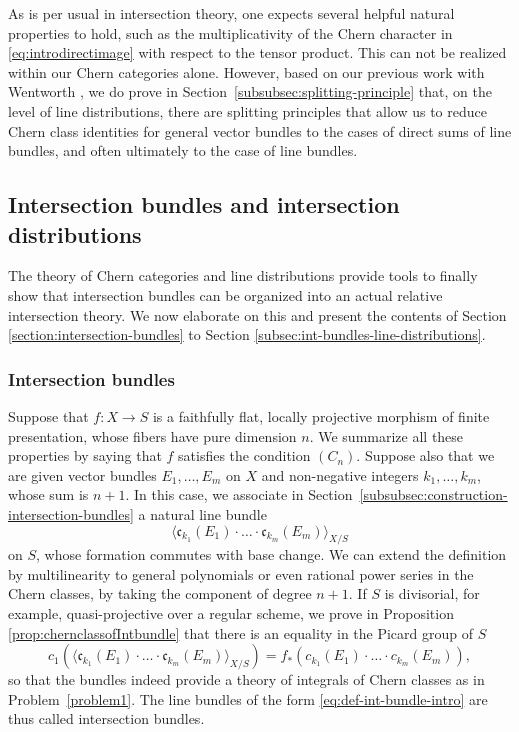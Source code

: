 \documentclass[11pt]{article}
\theoremstyle{plain}
\theoremstyle{definition}
\newcommand{\cfrak}{\mathfrak c}
\begin{document}
As is per usual in intersection theory, one expects several helpful natural properties to hold, such as the multiplicativity of the Chern character in \eqref{eq:introdirectimage} with respect to the tensor product. This can not be realized within our Chern categories alone. However, based on our previous work with Wentworth \cite{Eriksson-Freixas-Wentworth}, we do prove in Section~\ref{subsubsec:splitting-principle} that, on the level of line distributions, there are splitting principles that allow us to reduce Chern class identities for general vector bundles to the cases of direct sums of line bundles, and often ultimately to the case of line bundles.

\subsection{Intersection bundles and intersection distributions}
The theory of Chern categories and line distributions provide tools to finally show that intersection bundles can be organized into an actual relative intersection theory. We now elaborate on this and present the contents of Section \ref{section:intersection-bundles} to Section \ref{subsec:int-bundles-line-distributions}.

\subsubsection*{Intersection bundles} Suppose that $f: X \to S$ is a faithfully flat, locally projective morphism of finite presentation, whose fibers have pure dimension $n$. We summarize all these properties by saying that $f$ satisfies the condition $(C_{n})$. Suppose also that we are given vector bundles $E_1, \ldots, E_m$ on $X$ and non-negative integers $k_1, \ldots, k_m$, whose sum is $n+1$. In this case, we associate in Section~\ref{subsubsec:construction-intersection-bundles} a natural line bundle
\begin{equation}\label{eq:def-int-bundle-intro}
\langle \cfrak_{k_1}(E_1) \cdot \ldots \cdot \cfrak_{k_m}(E_m) \rangle_{X/S}
\end{equation}
on $S$, whose formation commutes with base change. We can extend the definition by multilinearity to general polynomials or even rational power series in the Chern classes, by taking the component of degree $n+1$. If $S$ is divisorial, for example, quasi-projective over a regular scheme, we prove in Proposition \ref{prop:chernclassofIntbundle} that there is an equality in the Picard group of $S$
\begin{equation}\label{eq:chern-classes-integral-intro}
c_1\left(\langle \cfrak_{k_1}(E_1) \cdot \ldots \cdot \cfrak_{k_m}(E_m) \rangle_{X/S}\right) = f_\ast \left( c_{k_1}(E_1) \cdot \ldots \cdot c_{k_m}(E_m) \right),
\end{equation}
so that the bundles indeed provide a theory of integrals of Chern classes as in Problem~\ref{problem1}. The line bundles of the form \eqref{eq:def-int-bundle-intro} are thus called intersection bundles.
\end{document}
